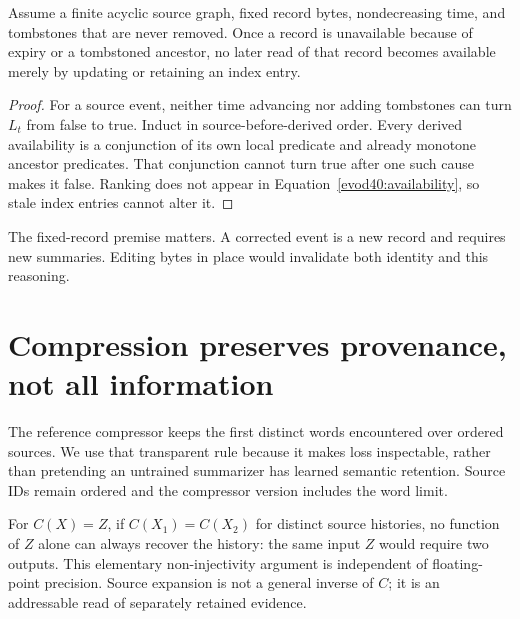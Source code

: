 
\par\medskip\noindent\begin{minipage}{\linewidth}
\begin{proposition}
Assume a finite acyclic source graph, fixed record bytes, nondecreasing time,
and tombstones that are never removed. Once a record is unavailable because
of expiry or a tombstoned ancestor, no later read of that record becomes
available merely by updating or retaining an index entry.
\end{proposition}
\begin{proof}
For a source event, neither time advancing nor adding tombstones can turn
$L_t$ from false to true. Induct in source-before-derived order. Every
derived availability is a conjunction of its own local predicate and already
monotone ancestor predicates. That conjunction cannot turn true after one
such cause makes it false. Ranking does not appear in
Equation~\ref{evod40:availability}, so stale index entries cannot alter it.
\end{proof}
\end{minipage}\par\medskip
The fixed-record premise matters. A corrected event is a new record and
requires new summaries. Editing bytes in place would invalidate both identity
and this reasoning.

\section{Compression preserves provenance, not all information}
\label{evod40:compression}
The reference compressor keeps the first distinct words encountered over ordered
sources. We use that transparent rule because it makes loss inspectable, rather than pretending an untrained summarizer has learned
semantic retention. Source IDs remain ordered and the compressor version
includes the word limit.


For $C(X)=Z$, if $C(X_1)=C(X_2)$ for distinct source histories, no function
of $Z$ alone can always recover the history: the same input $Z$ would require
two outputs. This elementary non-injectivity argument is independent of
floating-point precision. Source expansion is not a general inverse of $C$;
it is an addressable read of separately retained evidence.

